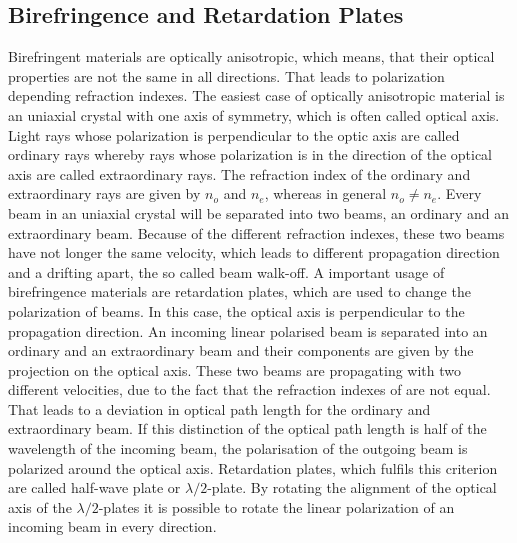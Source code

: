 \documentclass[10pt, a4paper, notitlepage, DIV=15]{scrartcl}
\begin{document}
\subsection{Birefringence and Retardation Plates}\label{sec:birefring}
Birefringent materials are optically anisotropic, which means, that their optical properties are not the same in all directions. That leads to polarization depending refraction indexes.\cite{hecht}\newline
The easiest case of optically anisotropic material is an uniaxial crystal with one axis of symmetry, which is often called optical axis. Light rays whose polarization is perpendicular to the optic axis are called ordinary rays whereby rays whose polarization is in the direction of the optical axis are called extraordinary rays. The refraction index of the ordinary and extraordinary rays are given by $n_o$ and $n_e$, whereas in general $n_o \neq n_e$.\newline
Every beam in an uniaxial crystal will be separated into two beams, an ordinary and an extraordinary beam. Because of the different refraction indexes, these two beams have not longer the same velocity, which leads to different propagation direction and a drifting apart, the so called beam walk-off.\newline
A important usage of birefringence materials are retardation plates, which are used to change the polarization of beams. In this case, the optical axis is perpendicular to the propagation direction. An incoming linear polarised beam is separated into an ordinary and an extraordinary beam and their components are given by the projection on the optical axis. These two beams are propagating with two different velocities, due to the fact that the refraction indexes of are not equal. That leads to a deviation in optical path length for the ordinary and extraordinary beam.\cite{meschede} 
\newline If this distinction of the optical path length is half of the wavelength of the incoming beam, the polarisation of the outgoing beam is polarized around the optical axis. Retardation plates, which fulfils this criterion are called half-wave plate or $\lambda/2$-plate. By rotating the alignment of the optical axis of the $\lambda/2$-plates it is possible to rotate the linear polarization of an incoming beam in every direction.\cite{hecht} 
\end{document}
